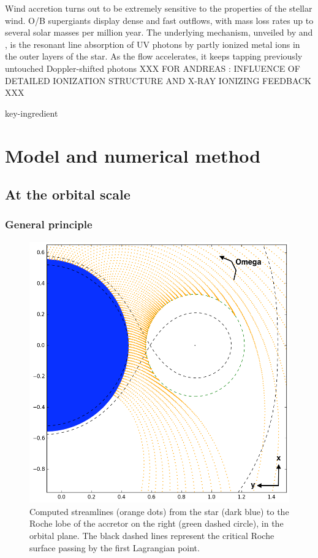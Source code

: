 \documentclass{aa}
\begin{document}
Wind accretion turns out to be extremely sensitive to the properties of the stellar wind. O/B supergiants display dense and fast outflows, with mass loss rates up to several solar masses per million year. The underlying mechanism, unveiled by \cite{Lucy1970} and \cite{Castor1975}, is the resonant line absorption of UV photons by partly ionized metal ions in the outer layers of the star. As the flow accelerates, it keeps tapping previously untouched Doppler-shifted photons XXX FOR ANDREAS : INFLUENCE OF DETAILED IONIZATION STRUCTURE AND X-RAY IONIZING FEEDBACK XXX


 key-ingredient


\section{Model and numerical method}
\label{sec:model}

\subsection{At the orbital scale}
\label{sec:orb_scale}
\subsubsection{General principle}
\label{sec:pple}

\begin{figure}
\centering
\includegraphics[width=0.9\columnwidth]{Pictures/big_picture.png}
\caption{Computed streamlines (orange dots) from the star (dark blue) to the Roche lobe of the accretor on the right (green dashed circle), in the orbital plane. The black dashed lines represent the critical Roche surface passing by the first Lagrangian point.}
\label{fig:big_picture}
\end{figure} 
\end{document}
